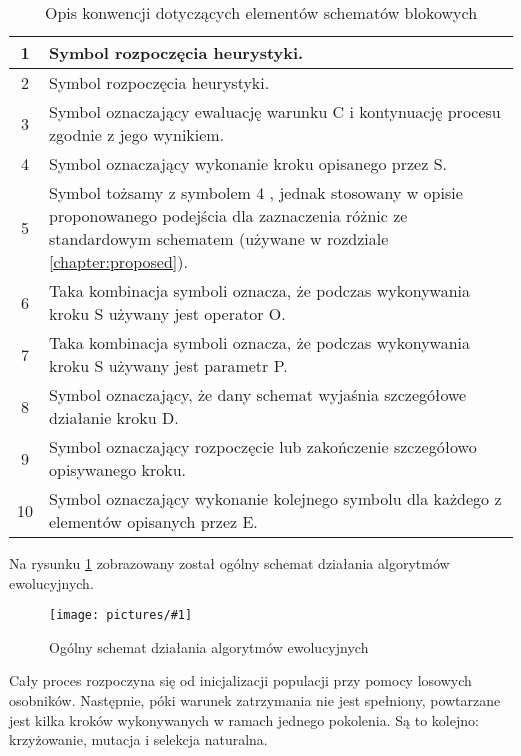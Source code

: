 \documentclass[twoside]{iisthesis}
\newcommand{\circled}[1]{ \textcircled{\scriptsize{#1}} }
\newcommand{\img}[1]{\texttt{[image: pictures/\#1]}}
\begin{document}
\begin{table}[H]
	\caption{Opis konwencji dotyczących elementów schematów blokowych \label{table:flowchart_conventions}}
	\begin{tabularx}{\linewidth}{|c|X|}
		\hline 
		\circled{1} & Symbol rozpoczęcia heurystyki. \\
		\hline
		\circled{2} & Symbol rozpoczęcia heurystyki. \\
		\hline
		\circled{3} & Symbol oznaczający ewaluację warunku C i kontynuację procesu zgodnie z jego wynikiem. \\
		\hline
		\circled{4} & Symbol oznaczający wykonanie kroku opisanego przez S. \\
		\hline
		\circled{5} & Symbol tożsamy z symbolem \circled{4}, jednak stosowany w opisie proponowanego podejścia dla zaznaczenia różnic ze standardowym schematem (używane w rozdziale \ref{chapter:proposed}).\\
		\hline
		\circled{6} & Taka kombinacja symboli oznacza, że podczas wykonywania kroku S używany jest operator O. \\
		\hline
		\circled{7} & Taka kombinacja symboli oznacza, że podczas wykonywania kroku S używany jest parametr P. \\
		\hline
		\circled{8} & Symbol oznaczający, że dany schemat wyjaśnia szczegółowe działanie kroku D. \\
		\hline
		\circled{9} & Symbol oznaczający rozpoczęcie lub zakończenie szczegółowo opisywanego kroku. \\
		\hline
		\circled{10} & Symbol oznaczający wykonanie kolejnego symbolu dla każdego z elementów opisanych przez E. \\
		\hline
	\end{tabularx}
\end{table}

\newpage

Na rysunku \ref{figure:ea_general} zobrazowany został ogólny schemat działania algorytmów ewolucyjnych. 

\begin{figure}
	\caption{Ogólny schemat działania algorytmów ewolucyjnych \label{figure:ea_general}}
	\img{ea_general.png}
\end{figure}

Cały proces rozpoczyna się od inicjalizacji populacji przy pomocy losowych osobników. Następnie, póki warunek zatrzymania nie jest spełniony, powtarzane jest kilka kroków wykonywanych w ramach jednego pokolenia. Są to kolejno: krzyżowanie, mutacja i selekcja naturalna.
\end{document}
